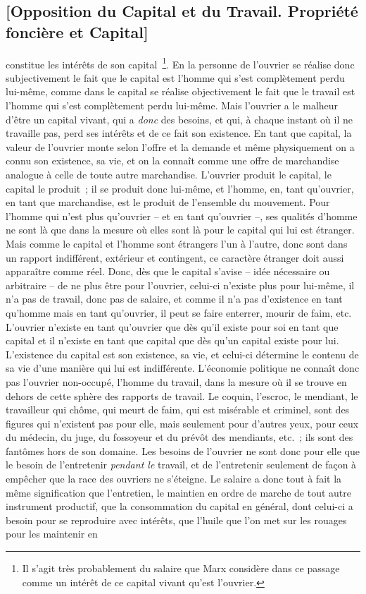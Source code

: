 \documentclass[french,twoside]{book} %
\begin{document}
\subsection[{[Opposition du Capital et du Travail. Propriété foncière et Capital]}]{[Opposition du Capital et du Travail. Propriété foncière et Capital]}
\noindent [XXXX] constitue les intérêts de son capital \footnote{Il s’agit très probablement du salaire que Marx considère dans ce passage comme un intérêt de ce capital vivant qu’est l’ouvrier.}. En la personne de l’ouvrier se réalise donc subjectivement le fait que le capital est l’homme qui s’est complètement perdu lui-même, comme dans le capital se réalise objectivement le fait que le travail est l’homme qui s’est complètement perdu lui-même. Mais l’ouvrier a le malheur d’être un capital vivant, qui a \emph{donc} des besoins, et qui, à chaque instant où il ne travaille pas, perd ses intérêts et de ce fait son existence. En tant que capital, la valeur de l’ouvrier monte selon l’offre et la demande et même physiquement on a connu son existence, sa vie, et on la connaît comme une offre de marchandise analogue à celle de toute autre marchandise. L’ouvrier produit le capital, le capital le produit ; il se produit donc lui-même, et l’homme, en, tant qu’ouvrier, en tant que marchandise, est le produit de l’ensemble du mouvement. Pour l’homme qui n’est plus qu’ouvrier – et en tant qu’ouvrier –, ses qualités d’homme ne sont là que dans la mesure où elles sont là pour le capital qui lui est étranger. Mais comme le capital et l’homme sont étrangers l’un à l’autre, donc sont dans un rapport indifférent, extérieur et contingent, ce caractère étranger doit aussi apparaître comme réel. Donc, dès que le capital s’avise – idée nécessaire ou arbitraire – de ne plus être pour l’ouvrier, celui-ci n’existe plus pour lui-même, il n’a pas de travail, donc pas de salaire, et comme il n’a pas d’existence en tant qu’homme mais en tant qu’ouvrier, il peut se faire enterrer, mourir de faim, etc. L’ouvrier n’existe en tant qu’ouvrier que dès qu’il existe pour soi en tant que capital et il n’existe en tant que capital que dès qu’un capital existe pour lui. L’existence du capital est son existence, sa vie, et celui-ci détermine le contenu de sa vie d’une manière qui lui est indifférente. L’économie politique ne connaît donc pas l’ouvrier non-occupé, l’homme du travail, dans la mesure où il se trouve en dehors de cette sphère des rapports de travail. Le coquin, l’escroc, le mendiant, le travailleur qui chôme, qui meurt de faim, qui est misérable et criminel, sont des figures qui n’existent pas pour elle, mais seulement pour d’autres yeux, pour ceux du médecin, du juge, du fossoyeur et du prévôt des mendiants, etc. ; ils sont des fantômes hors de son domaine. Les besoins de l’ouvrier ne sont donc pour elle que le besoin de l’entretenir \emph{pendant le} travail, et de l’entretenir seulement de façon à empêcher que la race des ouvriers ne s’éteigne. Le salaire a donc tout à fait la même signification que l’entretien, le maintien en ordre de marche de tout autre instrument productif, que la consommation du capital en général, dont celui-ci a besoin pour se reproduire avec intérêts, que l’huile que l’on met sur les rouages pour les maintenir en 
\end{document}
